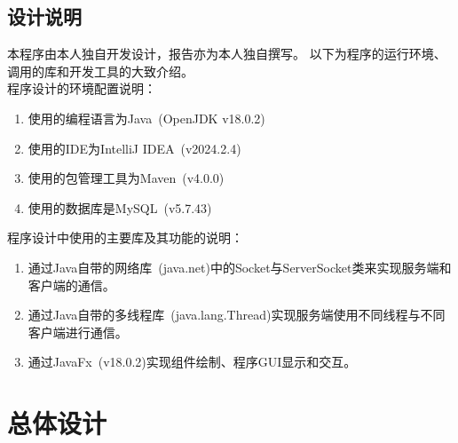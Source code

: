 \documentclass[utf8]{article}
\begin{document}
\subsection{设计说明}
本程序由本人独自开发设计，报告亦为本人独自撰写。
以下为程序的运行环境、调用的库和开发工具的大致介绍。\\
程序设计的环境配置说明：
\begin{enumerate}
    \item 使用的编程语言为Java\ (OpenJDK v18.0.2)
    \item 使用的IDE为IntelliJ IDEA\ (v2024.2.4)
    \item 使用的包管理工具为Maven\ (v4.0.0)
    \item 使用的数据库是MySQL\ (v5.7.43)
\end{enumerate}
程序设计中使用的主要库及其功能的说明：
\begin{enumerate}
    \item 通过Java自带的网络库\ (java.net)中的Socket与ServerSocket类来实现服务端和客户端的通信。
    \item 通过Java自带的多线程库\ (java.lang.Thread)实现服务端使用不同线程与不同客户端进行通信。
    \item 通过JavaFx\ (v18.0.2)实现组件绘制、程序GUI显示和交互。
\end{enumerate}

\section{总体设计}
\end{document}
